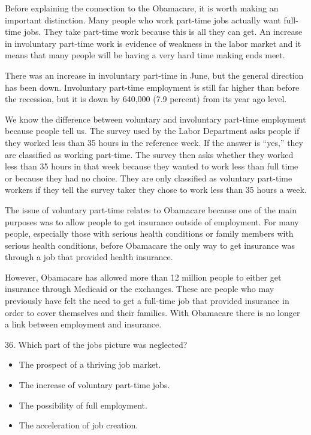 \documentclass[UTF8,11pt]{ctexart}
\begin{document}
Before explaining the connection to the Obamacare, it is worth making an important distinction. Many people who work part-time jobs actually want full-time jobs. They take part-time work because this is all they can get. An increase in involuntary part-time work is evidence of weakness in the labor market and it means that many people will be having a very hard time making ends meet.


There was an increase in involuntary part-time in June, but the general direction has been down. Involuntary part-time employment is still far higher than before the recession, but it is down by 640,000 (7.9 percent) from its year ago level.


We know the difference between voluntary and involuntary part-time employment because people tell us. The survey used by the Labor Department asks people if they worked less than 35 hours in the reference week. If the answer is “yes,” they are classified as working part-time. The survey then asks whether they worked less than 35 hours in that week because they wanted to work less than full time or because they had no choice. They are only classified as voluntary part-time workers if they tell the survey taker they chose to work less than 35 hours a week.


The issue of voluntary part-time relates to Obamacare because one of the main purposes was to allow people to get insurance outside of employment. For many people, especially those with serious health conditions or family members with serious health conditions, before Obamacare the only way to get insurance was through a job that provided health insurance.


However, Obamacare has allowed more than 12 million people to either get insurance through Medicaid or the exchanges. These are people who may previously have felt the need to get a full-time job that provided insurance in order to cover themselves and their families. With Obamacare there is no longer a link between employment and insurance.


36. Which part of the jobs picture was neglected?


\begin{itemize}[leftmargin=2em,itemsep=.2em,topsep=.4em]\item[A.] The prospect of a thriving job market.
\item[B.] The increase of voluntary part-time jobs.
\item[C.] The possibility of full employment.
\item[D.] The acceleration of job creation.
\end{itemize}
\end{document}
